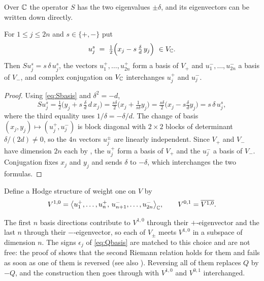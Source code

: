 Over $\mathbb{C}$ the operator $S$ has the two eigenvalues $\pm\delta$, and its
eigenvectors can be written down directly.

\begin{lemma}[Eigenbasis]\label{lem:eigenbasis}
For $1\le j\le2n$ and $s\in\{+,-\}$ put
\begin{equation}\label{eq:eigenvec}
  u_{j}^{s}\;=\;\tfrac12\Bigl(x_{j}-s\,\tfrac{\delta}{d}\,y_{j}\Bigr)
  \ \in V_{\mathbb{C}}.
\end{equation}
Then $S u_{j}^{s}=s\,\delta\,u_{j}^{s}$, the vectors $u_{1}^{+},\dots,u_{2n}^{+}$
form a basis of $V_{+}$ and $u_{1}^{-},\dots,u_{2n}^{-}$ a basis of $V_{-}$,
and complex conjugation on $V_{\mathbb{C}}$ interchanges $u_{j}^{+}$ and $u_{j}^{-}$.
\end{lemma}

\begin{proof}
Using \eqref{eq:Sbasis} and $\delta^{2}=-d$,
\[
  S u_{j}^{s}
  =\tfrac12\bigl(y_{j}+s\,\tfrac{\delta}{d}\,d\,x_{j}\bigr)
  =\tfrac{s\delta}{2}\bigl(x_{j}+\tfrac{1}{s\delta}y_{j}\bigr)
  =\tfrac{s\delta}{2}\bigl(x_{j}-s\tfrac{\delta}{d}y_{j}\bigr)
  =s\,\delta\,u_{j}^{s},
\]
where the third equality uses $1/\delta=-\delta/d$. The change of basis
$(x_{j},y_{j})\mapsto(u_{j}^{+},u_{j}^{-})$ is block diagonal with
$2\times2$ blocks of determinant $\delta/(2d)\ne0$, so the $4n$ vectors
$u_{j}^{\pm}$ are linearly independent. Since $V_{+}$ and $V_{-}$ have
dimension $2n$ each by , the $u_{j}^{+}$ form a basis of
$V_{+}$ and the $u_{j}^{-}$ a basis of $V_{-}$. Conjugation fixes $x_{j}$ and
$y_{j}$ and sends $\delta$ to $-\delta$, which interchanges the two formulas.
\end{proof}

\begin{definition}\label{def:modelHS}
Define a Hodge structure of weight one on $V$ by
\begin{equation}\label{eq:V10}
  V^{1,0}
  =\bigl\langle u_{1}^{+},\dots,u_{n}^{+},\,
      u_{n+1}^{-},\dots,u_{2n}^{-}\bigr\rangle_{\mathbb{C}},
  \qquad
  V^{0,1}=\overline{V^{1,0}} .
\end{equation}
\end{definition}

The first $n$ basis directions contribute to $V^{1,0}$ through their
$+$-eigenvector and the last $n$ through their $-$-eigenvector, so each of
$V_{\pm}$ meets $V^{1,0}$ in a subspace of dimension $n$. The signs
$\epsilon_{j}$ of \eqref{eq:Qbasis} are matched to this choice and are not
free: the proof of  shows that the second Riemann relation
holds for them and fails as soon as one of them is reversed (see also
). Reversing all of them replaces $Q$ by $-Q$, and
the construction then goes through with $V^{1,0}$ and $V^{0,1}$ interchanged.

